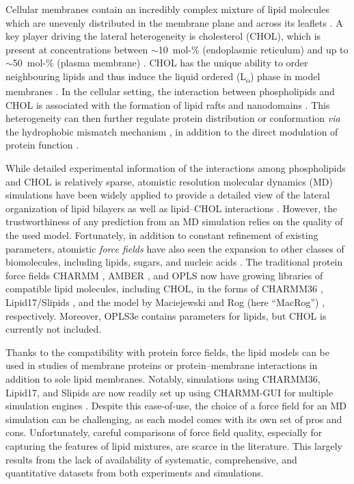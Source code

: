 \documentclass[aps,prl,superscriptaddress]{revtex4-2}
\begin{document}
Cellular membranes contain an incredibly complex mixture of lipid molecules \cite{lorent2020plasma} which are unevenly distributed in the membrane plane and across its leaflets \cite{van2008membrane,wang2020membrane,kinnun2020lateral}. A key player driving the lateral heterogeneity is cholesterol (CHOL), which is present at concentrations between $\sim$10~mol-\% (endoplasmic reticulum) and up to $\sim$50~mol-\% (plasma membrane) \cite{van2008membrane}. CHOL has the unique ability to order neighbouring lipids and thus induce the liquid ordered (L\textsubscript{o}) phase in model membranes \cite{mouritsen2004s,ipsen87,kinnunen91,rog2009ordering}. In the cellular setting, the interaction between phospholipids and CHOL is associated with the formation of lipid rafts and nanodomains \cite{Simons97,cebecauer2018membrane}. This heterogeneity can then further regulate protein distribution \cite{milovanovic2015hydrophobic} or conformation \cite{kelkar2007modulation} \textit{via} the hydrophobic mismatch mechanism \cite{killian1998hydrophobic}, in addition to the direct modulation of protein function \cite{gimpl2016interaction,guixa2017membrane}.

While detailed experimental information of the interactions among phospholipids and CHOL is relatively sparse, atomistic resolution molecular dynamics (MD) simulations have been widely applied to provide a detailed view of the lateral organization of lipid bilayers as well as lipid--CHOL interactions \cite{rog14,rog2009ordering,berkowitz2009detailed}. However, the trustworthiness of any prediction from an MD simulation relies on the quality of the used model. Fortunately, in addition to constant refinement of existing parameters, atomistic \emph{force fields} have also seen the expansion to other classes of biomolecules, including lipids, sugars, and nucleic acids \cite{leonard2019developing,marrink2019computational}. The traditional protein force fields CHARMM \cite{brooks1983charmm}, AMBER \cite{cornell1995second}, and OPLS \cite{jorgensen1988opls,harder2016opls3} now have growing libraries of compatible lipid molecules, including CHOL, in the forms of CHARMM36 \cite{Klauda06,lim12}, Lipid17/Slipids \cite{dickson14,madej15,jambeck12,jambeck12b,jambeck13b,grote2020optimization}, and the model by Maciejewski and Rog (here ``MacRog'') \cite{maciejewski14,kulig14,kulig15,Kulig15b}, respectively. Moreover, OPLS3e \cite{harder2016opls3} contains parameters for lipids, but CHOL is currently not included. 

Thanks to the compatibility with protein force fields, the lipid models can be used in studies of membrane proteins or protein--membrane interactions in addition to sole lipid membranes. Notably, simulations using CHARMM36, Lipid17, and Slipids are now readily set up using CHARMM-GUI for multiple simulation engines \cite{lee16,lee2020charmm}. Despite this ease-of-use, the choice of a force field for an MD simulation can be challenging, as each model comes with its own set of pros and cons. Unfortunately, careful comparisons of force field quality, especially for capturing the features of lipid mixtures, are scarce in the literature. This largely results from the lack of availability of systematic, comprehensive, and quantitative datasets from both experiments and simulations.
\end{document}
